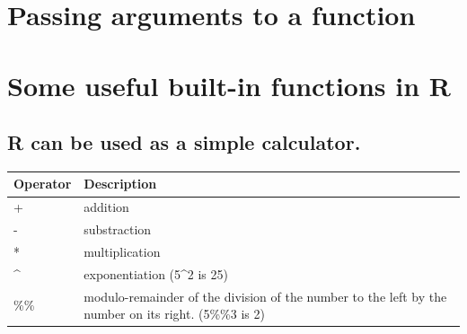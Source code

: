 \documentclass[]{book}
\begin{document}
\hypertarget{passing-arguments-to-a-function}{%
\section{Passing arguments to a function}\label{passing-arguments-to-a-function}}

\hypertarget{some-useful-built-in-functions-in-r}{%
\section{Some useful built-in functions in R}\label{some-useful-built-in-functions-in-r}}

\hypertarget{r-can-be-used-as-a-simple-calculator.}{%
\subsection{R can be used as a simple calculator.}\label{r-can-be-used-as-a-simple-calculator.}}

\begin{longtable}[]{@{}ll@{}}
\toprule
\begin{minipage}[b]{0.47\columnwidth}\raggedright
Operator\strut
\end{minipage} & \begin{minipage}[b]{0.47\columnwidth}\raggedright
Description\strut
\end{minipage}\tabularnewline
\midrule
\endhead
\begin{minipage}[t]{0.47\columnwidth}\raggedright
+\strut
\end{minipage} & \begin{minipage}[t]{0.47\columnwidth}\raggedright
addition\strut
\end{minipage}\tabularnewline
\begin{minipage}[t]{0.47\columnwidth}\raggedright
-\strut
\end{minipage} & \begin{minipage}[t]{0.47\columnwidth}\raggedright
substraction\strut
\end{minipage}\tabularnewline
\begin{minipage}[t]{0.47\columnwidth}\raggedright
*\strut
\end{minipage} & \begin{minipage}[t]{0.47\columnwidth}\raggedright
multiplication\strut
\end{minipage}\tabularnewline
\begin{minipage}[t]{0.47\columnwidth}\raggedright
\^{}\strut
\end{minipage} & \begin{minipage}[t]{0.47\columnwidth}\raggedright
exponentiation (5\^{}2 is 25)\strut
\end{minipage}\tabularnewline
\begin{minipage}[t]{0.47\columnwidth}\raggedright
\%\%\strut
\end{minipage} & \begin{minipage}[t]{0.47\columnwidth}\raggedright
modulo-remainder of the division of the number to the left by the number on its right. (5\%\%3 is 2)\strut
\end{minipage}\tabularnewline
\bottomrule
\end{longtable}
\end{document}
